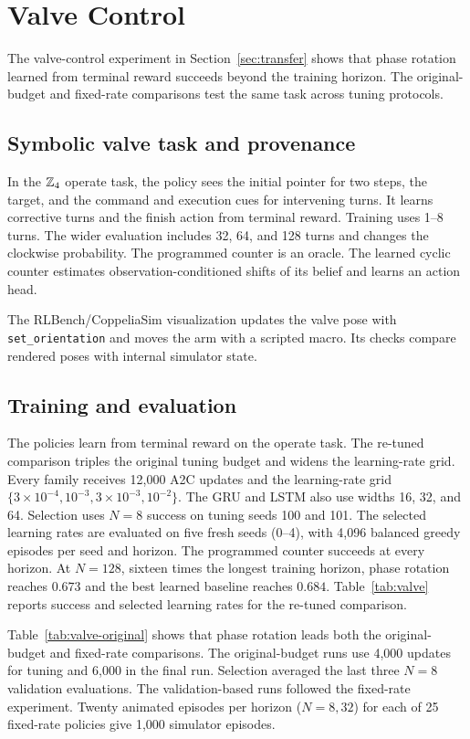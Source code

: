 \section{Valve Control}
\label{app:valve}
The valve-control experiment in Section~\ref{sec:transfer} shows that phase
rotation learned from terminal reward succeeds beyond the training horizon.
The original-budget and fixed-rate comparisons test the same task across
tuning protocols.

\subsection{Symbolic valve task and provenance}
\label{app:robot}
In the $\mathbb{Z}_4$ operate task, the policy sees the initial pointer for two
steps, the target, and the command and execution cues for intervening
turns. It learns corrective turns and the finish action from terminal
reward. Training uses 1--8 turns. The wider evaluation
includes 32, 64, and 128 turns and changes the clockwise probability.
The programmed counter is an oracle. The learned cyclic counter estimates
observation-conditioned shifts of its belief and learns an action head.

The RLBench/CoppeliaSim visualization updates the valve pose with
\texttt{set\_orientation} and moves the arm with a scripted macro. Its checks
compare rendered poses with internal simulator state.

\subsection{Training and evaluation}
The policies learn from terminal reward on the operate task. The re-tuned
comparison triples the original tuning budget and widens the learning-rate
grid. Every family receives 12{,}000 A2C updates
and the learning-rate grid $\{3\times10^{-4},10^{-3},3\times10^{-3},10^{-2}\}$.
The GRU and LSTM also use widths 16, 32, and 64. Selection uses $N=8$ success
on tuning seeds 100 and 101. The selected learning rates are evaluated on five
fresh seeds (0--4), with 4{,}096 balanced greedy episodes per seed and horizon.
The programmed counter succeeds at every horizon. At $N=128$, sixteen
times the longest training horizon, phase rotation reaches $0.673$ and the
best learned baseline reaches $0.684$.
Table~\ref{tab:valve} reports success and selected learning rates for the
re-tuned comparison.

Table~\ref{tab:valve-original} shows that phase rotation leads both the
original-budget and fixed-rate comparisons. The original-budget runs use
4,000 updates for tuning and 6,000 in the final run. Selection averaged the
last three $N=8$ validation evaluations. The validation-based runs followed
the fixed-rate experiment. Twenty animated episodes per horizon ($N=8,32$)
for each of 25 fixed-rate policies give 1,000 simulator episodes.



\FloatBarrier
